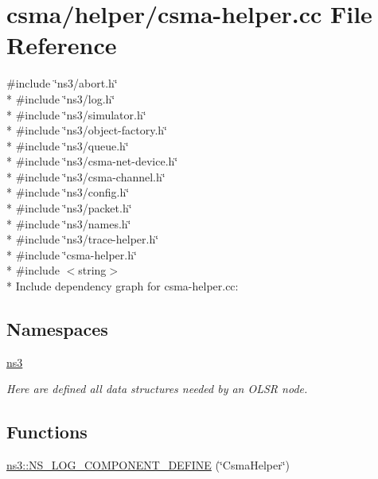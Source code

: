 \hypertarget{csma-helper_8cc}{}\section{csma/helper/csma-\/helper.cc File Reference}
\label{csma-helper_8cc}
{\ttfamily \#include \char`\"{}ns3/abort.\+h\char`\"{}}\\*
{\ttfamily \#include \char`\"{}ns3/log.\+h\char`\"{}}\\*
{\ttfamily \#include \char`\"{}ns3/simulator.\+h\char`\"{}}\\*
{\ttfamily \#include \char`\"{}ns3/object-\/factory.\+h\char`\"{}}\\*
{\ttfamily \#include \char`\"{}ns3/queue.\+h\char`\"{}}\\*
{\ttfamily \#include \char`\"{}ns3/csma-\/net-\/device.\+h\char`\"{}}\\*
{\ttfamily \#include \char`\"{}ns3/csma-\/channel.\+h\char`\"{}}\\*
{\ttfamily \#include \char`\"{}ns3/config.\+h\char`\"{}}\\*
{\ttfamily \#include \char`\"{}ns3/packet.\+h\char`\"{}}\\*
{\ttfamily \#include \char`\"{}ns3/names.\+h\char`\"{}}\\*
{\ttfamily \#include \char`\"{}ns3/trace-\/helper.\+h\char`\"{}}\\*
{\ttfamily \#include \char`\"{}csma-\/helper.\+h\char`\"{}}\\*
{\ttfamily \#include $<$string$>$}\\*
Include dependency graph for csma-\/helper.cc\+:
\subsection*{Namespaces}
\begin{DoxyCompactItemize}
\item 
 \hyperlink{namespacens3}{ns3}
\begin{DoxyCompactList}\small\item\em Here are defined all data structures needed by an O\+L\+SR node. \end{DoxyCompactList}\end{DoxyCompactItemize}
\subsection*{Functions}
\begin{DoxyCompactItemize}
\item 
\hyperlink{namespacens3_aa0a4e9985b603951c6d4158fdb83380c}{ns3\+::\+N\+S\+\_\+\+L\+O\+G\+\_\+\+C\+O\+M\+P\+O\+N\+E\+N\+T\+\_\+\+D\+E\+F\+I\+NE} (\char`\"{}Csma\+Helper\char`\"{})
\end{DoxyCompactItemize}
